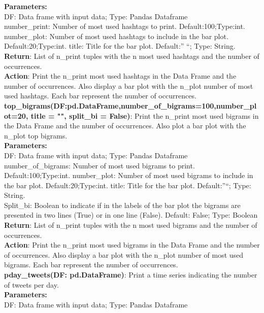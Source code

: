 \textbf{Parameters:}\\
DF: Data frame with input data; Type: Pandas Dataframe\\
number\_print: Number of most used hashtags to print. Default:100;Type:int.
number\_plot: Number of most used hashtags to include in the bar plot. Default:20;Type:int.
title: Title for the bar plot. Default:” “; Type: String.\\
\textbf{Return}: List of n\_print tuples with the n most used hashtags and the number of occurrences.\\
\textbf{Action}: Print the n\_print most used hashtags in the Data Frame and the number of occurrences. Also display a bar plot with the n\_plot number of most used hashtags. Each bar represent the number of occurrences.\\
\newline
\newline
\noindent\textbf{top\_bigrams(DF:pd.DataFrame,number\_of\_bigrams=100,number\_plot=20, title = "", split\_bi = False)}: Print the n\_print most used bigrams in the Data Frame and the number of occurrences. Also plot a bar plot with the n\_plot top bigrams.\\
\textbf{Parameters:}\\
DF: Data frame with input data; Type: Pandas Dataframe\\
number\_of\_bigrams: Number of most used bigrams to print. Default:100;Type:int.
number\_plot: Number of most used bigrams to include in the bar plot. Default:20;Type:int.
title: Title for the bar plot. Default:”“; Type: String.\\
Split\_bi: Boolean to indicate if in the labels of the bar plot the bigrams are presented in two lines (True) or in one line (False). Default: False; Type: Boolean\\
\textbf{Return}: List of n\_print tuples with the n most used bigrams and the number of occurrences.\\
\textbf{Action}: Print the n\_print most used bigrams in the Data Frame and the number of occurrences. Also display a bar plot with the n\_plot number of most used bigrams. Each bar represent the number of occurrences.\\
\newline
\newline
\noindent\textbf{pday\_tweets(DF: pd.DataFrame)}: Print a time series indicating the number of tweets per day.\\
\textbf{Parameters:}\\
DF: Data frame with input data; Type: Pandas Dataframe\\
